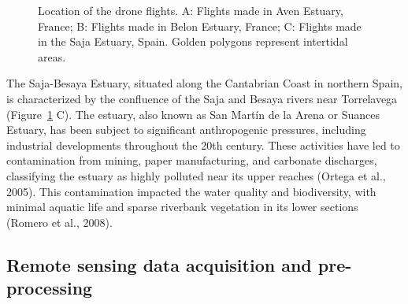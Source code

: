 \documentclass[
  letterpaper,
  11pt,
  english,
  singlespacing,
  headsepline]{MastersDoctoralThesis}
\begin{document}
\begin{spacing}{1.5}
\begin{figure}
{}

\caption{\label{fig-location_sites_g}Location of the drone flights. A:
Flights made in Aven Estuary, France; B: Flights made in Belon Estuary,
France; C: Flights made in the Saja Estuary, Spain. Golden polygons
represent intertidal areas.}

\end{figure}%

The Saja-Besaya Estuary, situated along the Cantabrian Coast in northern
Spain, is characterized by the confluence of the Saja and Besaya rivers
near Torrelavega (Figure~\ref{fig-location_sites_g} C). The estuary,
also known as San Martín de la Arena or Suances Estuary, has been
subject to significant anthropogenic pressures, including industrial
developments throughout the 20th century. These activities have led to
contamination from mining, paper manufacturing, and carbonate
discharges, classifying the estuary as highly polluted near its upper
reaches (Ortega et al., 2005). This contamination impacted the water
quality and biodiversity, with minimal aquatic life and sparse riverbank
vegetation in its lower sections (Romero et al., 2008).

\subsection{Remote sensing data acquisition and
pre-processing}\label{sec-DroneFlights}

\begin{figure}

\centering{

}
\end{figure}
\end{spacing}
\end{document}
